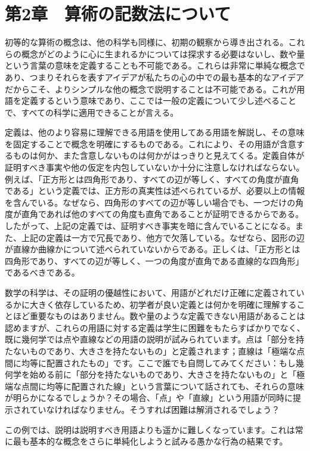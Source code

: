 \documentclass[a4paper,11pt,openany]{ltjsbook}
\begin{document}
\chapter{第2章　算術の記数法について}

初等的な算術の概念は、他の科学も同様に、初期の観察から導き出される。これらの概念がどのように心に生まれるかについては探求する必要はないし、数や量という言葉の意味を定義することも不可能である。これらは非常に単純な概念であり、つまりそれらを表すアイデアが私たちの心の中での最も基本的なアイデアだからこそ、よりシンプルな他の概念で説明することは不可能である。これが用語を定義するという意味であり、ここでは一般の定義について少し述べることで、すべての科学に適用できることが言える。

定義は、他のより容易に理解できる用語を使用してある用語を解説し、その意味を固定することで概念を明確にするものである。これにより、その用語が含意するものは何か、また含意しないものは何かがはっきりと見えてくる。定義自体が証明すべき事実や他の仮定を内包していないか十分に注意しなければならない。例えば、「正方形とは四角形であり、すべての辺が等しく、すべての角度が直角である」という定義では、正方形の真実性は述べられているが、必要以上の情報を含んでいる。なぜなら、四角形のすべての辺が等しい場合でも、一つだけの角度が直角であれば他のすべての角度も直角であることが証明できるからである。したがって、上記の定義では、証明すべき事実を暗に含んでいることになる。また、上記の定義は一方で冗長であり、他方で欠落している。なぜなら、図形の辺が直線か曲線かについて述べられていないからである。正しくは、「正方形とは四角形であり、すべての辺が等しく、一つの角度が直角である直線的な四角形」であるべきである。

数学の科学は、その証明の優越性において、用語がどれだけ正確に定義されているかに大きく依存しているため、初学者が良い定義とは何かを明確に理解することほど重要なものはありません。数や量のような定義できない用語があることは認めますが、これらの用語に対する定義は学生に困難をもたらすばかりでなく、既に幾何学では点や直線などの用語の説明が試みられています。点は「部分を持たないものであり、大きさを持たないもの」と定義されます；直線は「極端な点間に均等に配置されたもの」です。ここで誰でも自問してみてください：もし幾何学を始める前に「部分を持たないものであり、大きさを持たないもの」と「極端な点間に均等に配置された線」という言葉について話されても、それらの意味が明らかになるでしょうか？その場合、「点」や「直線」という用語が同時に提示されていなければなりません。そうすれば困難は解消されるでしょう？

この例では、説明は説明すべき用語よりも遥かに難しくなっています。これは常に最も基本的な概念をさらに単純化しようと試みる愚かな行為の結果です。
\end{document}
